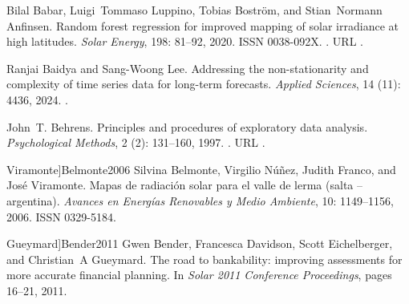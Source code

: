 \documentclass[letterpaper,12pt, twoside]{report}
\providecommand{\DIFdeltex}[1]{{\protect\color{red} \scriptsize #1}} %
\providecommand{\DIFdel}[1]{\texorpdfstring{\DIFdeltex{#1}}{}} %
\begin{document}
\DIFdel{Bilal Babar, Luigi~Tommaso Luppino, Tobias Boström, and Stian~Normann
  Anfinsen.
}%
\DIFdel{Random forest regression for improved mapping of solar irradiance at
  high latitudes.
}%
\DIFdel{\emph{Solar Energy}, 198:}%
\DIFdel{81--92, 2020.
}%
\DIFdel{ISSN 0038-092X.
}%
\DIFdel{.
}%
\DIFdel{URL
  }%
\DIFdel{.
}%

\DIFdel{Ranjai Baidya and Sang-Woong Lee.
}%
\DIFdel{Addressing the non-stationarity and complexity of time series data
  for long-term forecasts.
}%
\DIFdel{\emph{Applied Sciences}, 14}%
\DIFdel{(11):}%
\DIFdel{4436, 2024.
}%
\DIFdel{.
}%

\DIFdel{John~T. Behrens.
}%
\DIFdel{Principles and procedures of exploratory data analysis.
}%
\DIFdel{\emph{Psychological Methods}, 2}%
\DIFdel{(2):}%
\DIFdel{131--160,
  1997.
}%
\DIFdel{.
}%
\DIFdel{URL }%
\DIFdel{.
}%

  Viramonte]{Belmonte2006}
\DIFdel{Silvina Belmonte, Virgilio Núñez, Judith Franco, and José Viramonte.
}%
\DIFdel{Mapas de radiación solar para el valle de lerma (salta –
  argentina).
}%
\DIFdel{\emph{Avances en Energías Renovables y Medio Ambiente}, 10:}%
\DIFdel{1149--1156, 2006.
}%
\DIFdel{ISSN 0329-5184.
}%

  Gueymard]{Bender2011}
\DIFdel{Gwen Bender, Francesca Davidson, Scott Eichelberger, and Christian~A Gueymard.
}%
\DIFdel{The road to bankability: improving assessments for more accurate
  financial planning.
}%
\DIFdel{In \emph{Solar 2011 Conference Proceedings}, pages 16--21, 2011.
}%
\end{document}
